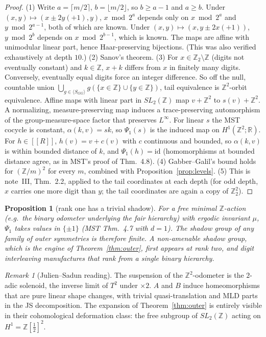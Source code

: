 \documentclass[11pt]{article}
\newtheorem{proposition}[theorem]{Proposition}
\theoremstyle{definition}
\theoremstyle{remark}
\newtheorem{remark}[theorem]{Remark}
\newcommand{\Z}{\mathbb Z}
\newcommand{\R}{\mathbb R}
\newcommand{\ff}[1]{[\![#1]\!]}
\begin{document}
\begin{proof}
(1) Write $a=\lceil m/2\rceil$, $b=\lfloor m/2\rfloor$, so $b\ge a-1$ and $a\ge b$. Under $(x,y)\mapsto(x\pm2y(+1),y)$, $x\bmod2^a$ depends only on $x\bmod 2^a$ and $y\bmod2^{a-1}$, both of which are known. Under $(x,y)\mapsto(x,y\pm2x(+1))$, $y\bmod2^b$ depends on $x\bmod2^{b-1}$, which is known. The maps are affine with unimodular linear part, hence Haar-preserving bijections. (This was also verified exhaustively at depth $10$.)
(2) Sanov's theorem.
(3) For $x\in\Z_2\setminus\Z$ (digits not eventually constant) and $k\in\Z$, $x+k$ differs from $x$ in finitely many digits. Conversely, eventually equal digits force an integer difference. So off the null, countable union $\bigcup_{g\in\langle S_{GG}\rangle}g(\{x\in\Z\}\cup\{y\in\Z\})$, tail equivalence is $\Z^2$-orbit equivalence. Affine maps with linear part in $SL_2(\Z)$ map $v+\Z^2$ to $s(v)+\Z^2$. A normalizing, measure-preserving map induces a trace-preserving automorphism of the group-measure-space factor that preserves $L^\infty$. For linear $s$ the MST cocycle is constant, $\alpha(k,v)=sk$, so $\Psi_1(s)$ is the induced map on $H^1(\Z^2;\R)$. For $h\in\ff R$, $h(v)=v+c(v)$ with $c$ continuous and bounded, so $\alpha(k,v)$ is within bounded distance of $k$, and $\Psi_1(h)=\mathrm{id}$ (homomorphisms at bounded distance agree, as in MST's proof of Thm.~4.8).
(4) Gabber--Galil's bound holds for $(\Z/m)^2$ for every $m$, combined with Proposition~\ref{prop:levels}.
(5) This is note~III, Thm.~2.2, applied to the tail coordinates at each depth (for odd depth, $x$ carries one more digit than $y$; the tail coordinates are again a copy of $\Z_2^2$).
\end{proof}

\begin{proposition}[rank one has a trivial shadow]
For a free minimal $\Z$-action (e.g.\ the binary odometer underlying the fair hierarchy) with ergodic invariant $\mu$, $\Psi_1$ takes values in $\{\pm1\}$ (MST Thm.~4.7 with $d=1$). The shadow group of any family of outer symmetries is therefore finite. A non-amenable shadow group, which is the engine of Theorem~\ref{thm:outer}, first appears at rank two, and digit interleaving manufactures that rank from a single binary hierarchy.
\end{proposition}

\begin{remark}[Julien--Sadun reading]
The suspension of the $\Z^2$-odometer is the $2$-adic solenoid, the inverse limit of $T^2$ under $\times2$. $A$ and $B$ induce homeomorphisms that are pure linear shape changes, with trivial quasi-translation and MLD parts in the JS decomposition. The expansion of Theorem~\ref{thm:outer} is entirely visible in their cohomological deformation class: the free subgroup of $SL_2(\Z)$ acting on $H^1=\Z[\frac12]^2$.
\end{remark}
\end{document}

